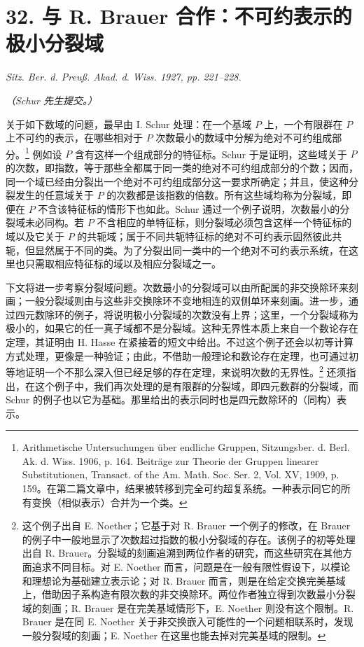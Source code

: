 \section*{32. 与 R. Brauer 合作：不可约表示的极小分裂域}
\emph{Sitz. Ber. d. Preuß. Akad. d. Wiss. 1927, pp. 221--228.}

\begin{center}\emph{（Schur 先生提交。）}\end{center}

关于如下数域的问题，最早由 I. Schur 处理：在一个基域 $P$ 上，一个有限群在 $P$ 上不可约的表示，在哪些相对于 $P$ 次数最小的数域中分解为绝对不可约组成部分。\footnote{Arithmetische Untersuchungen über endliche Gruppen, Sitzungsber. d. Berl. Ak. d. Wiss. 1906, p. 164. Beiträge zur Theorie der Gruppen linearer Substitutionen, Transact. of the Am. Math. Soc. Ser. 2, Vol. XV, 1909, p. 159。在第二篇文章中，结果被转移到完全可约超复系统。一种表示同它的所有变换（相似表示）合并为一个类。} 例如设 $P$ 含有这样一个组成部分的特征标。Schur 于是证明，这些域关于 $P$ 的次数，即指数，等于那些全都属于同一类的绝对不可约组成部分的个数；因而，同一个域已经由分裂出一个绝对不可约组成部分这一要求所确定；并且，使这种分裂发生的任意域关于 $P$ 的次数都是该指数的倍数。所有这些域均称为分裂域，即便在 $P$ 不含该特征标的情形下也如此。Schur 通过一个例子说明，次数最小的分裂域未必同构。若 $P$ 不含相应的单特征标，则分裂域必须包含这样一个特征标的域以及它关于 $P$ 的共轭域；属于不同共轭特征标的绝对不可约表示固然彼此共轭，但显然属于不同的类。为了分裂出同一类中的一个绝对不可约表示系统，在这里也只需取相应特征标的域以及相应分裂域之一。

下文将进一步考察分裂域问题。次数最小的分裂域可以由所配属的非交换除环来刻画；一般分裂域则由与这些非交换除环不变地相连的双侧单环来刻画。进一步，通过四元数除环的例子，将说明极小分裂域的次数没有上界；这里，一个分裂域称为极小的，如果它的任一真子域都不是分裂域。这种无界性本质上来自一个数论存在定理，其证明由 H. Hasse 在紧接着的短文中给出。不过这个例子还会以初等计算方式处理，更像是一种验证；由此，不借助一般理论和数论存在定理，也可通过初等地证明一个不那么深入但已经足够的存在定理，来说明次数的无界性。\footnote{这个例子出自 E. Noether；它基于对 R. Brauer 一个例子的修改，在 Brauer 的例子中一般地显示了次数超过指数的极小分裂域的存在。该例子的初等处理出自 R. Brauer。分裂域的刻画追溯到两位作者的研究，而这些研究在其他方面追求不同目标。对 E. Noether 而言，问题是在一般有限性假设下，以模论和理想论为基础建立表示论；对 R. Brauer 而言，则是在给定交换完美基域上，借助因子系构造有限次数的非交换除环。两位作者独立得到次数最小分裂域的刻画；R. Brauer 是在完美基域情形下，E. Noether 则没有这个限制。R. Brauer 是在同 E. Noether 关于非交换嵌入可能性的一个问题相联系时，发现一般分裂域的刻画；E. Noether 在这里也能去掉对完美基域的限制。} 还须指出，在这个例子中，我们再次处理的是有限群的分裂域，即四元数群的分裂域，而 Schur 的例子也以它为基础。那里给出的表示同时也是四元数除环的（同构）表示。

